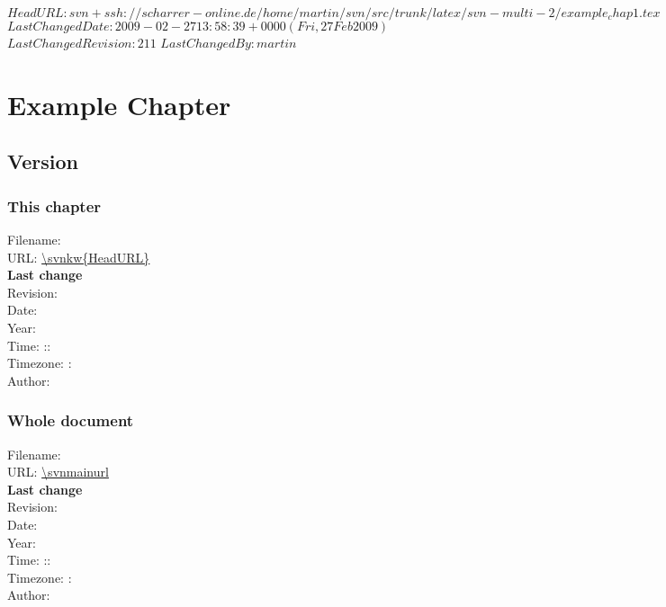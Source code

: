 \svnidlong
{$HeadURL: svn+ssh://scharrer-online.de/home/martin/svn/src/trunk/latex/svn-multi-2/example_chap1.tex $}
{$LastChangedDate: 2009-02-27 13:58:39 +0000 (Fri, 27 Feb 2009) $}
{$LastChangedRevision: 211 $}
{$LastChangedBy: martin $}

\chapter{Example Chapter}

\section{Version}
\subsection*{This chapter}
Filename: \\
URL: \url{\svnkw{HeadURL}}\\
\textbf{Last change}\\
Revision: \svnfilerev\\
Date: \svnfiledate\\
Year: \svnfileyear\\
Time: \svnfilehour:\svnfileminute:\svnfilesecond\ \\
Timezone: \svnfiletimezonehour : \svnfiletimezoneminute\\
Author: \svnfileauthor\\

\subsection*{Whole document}
Filename: \svnnolinkurl{\svnmainfilename}\\
URL: \url{\svnmainurl}\\
\textbf{Last change}\\
Revision: \svnrev\\
Date: \svndate\\
Year: \svnyear\\
Time: \svnhour:\svnminute:\svnsecond\ \\
Timezone: \svntimezonehour : \svntimezoneminute\\
Author: \svnauthor\\

